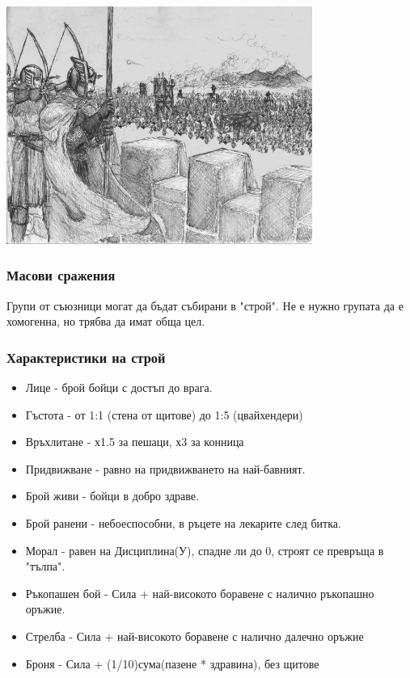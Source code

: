 \begin{center}
\includegraphics[width=0.75\textwidth]{../images/siege}~
\\[1cm]
\end{center}


\subsubsection{Масови сражения}
Групи от съюзници могат да бъдат събирани в "строй".
Не е нужно групата да е хомогенна, но трябва да имат обща цел.

\subsubsection{Характеристики на строй}
\begin{itemize}
\item{Лице - брой бойци с достъп до врага.}
\item{Гъстота - от 1:1 (стена от щитове) до 1:5 (цвайхендери)}
\item{Връхлитане - х1.5 за пешаци, х3 за конница}
\item{Придвижване - равно на придвижването на най-бавният.}

\item{Брой живи - бойци в добро здраве.}
\item{Брой ранени - небоеспособни, в ръцете на лекарите след битка.}
\item{Морал - равен на Дисциплина(У), спадне ли до 0, строят се превръща в "тълпа".}

\item{Ръкопашен бой - Сила + най-високото боравене с налично ръкопашно оръжие.}
\item{Стрелба - Сила + най-високото боравене с налично далечно оръжие}
\item{Броня - Сила + (1/10)сума(пазене * здравина), без щитове}
\end{itemize}
